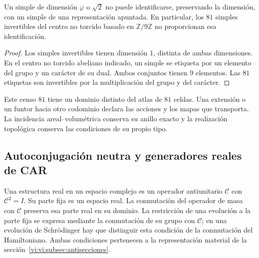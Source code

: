 \begin{proposition}
\label{vi:vi:prop:apuntada}
Un simple de dimensión $\varphi$ o $\sqrt2$ no puede identificarse,
preservando la dimensión, con un simple de una representación apuntada.
En particular, los $81$ simples invertibles del centro no torcido
basado en $\mathbb Z/9\mathbb Z$ no proporcionan esa identificación.
\end{proposition}
\begin{proof}
Los simples invertibles tienen dimensión $1$, distinta de ambas
dimensiones. En el centro no torcido abeliano indicado, un simple se
etiqueta por un elemento del grupo y un carácter de su dual. Ambos
conjuntos tienen $9$ elementos. Las $81$ etiquetas son invertibles
por la multiplicación del grupo y del carácter.
\end{proof}

Este censo $81$ tiene un dominio distinto del atlas de $81$ celdas.
Una extensión o un funtor hacia otro codominio declara las acciones
y los mapas que transporta. La incidencia areal--volumétrica conserva
su anillo exacto y la realización topológica conserva las condiciones
de su propio tipo.

\subsection{Autoconjugación neutra y generadores reales de CAR}
\label{vi:vi:subsec:majorana-categorias}

Una estructura real en un espacio complejo es un operador antiunitario
$\mathcal C$ con $\mathcal C^2=I$. Su parte fija es un espacio real.
La conmutación del operador de masa con $\mathcal C$ preserva esa
parte real en su dominio. La restricción de una evolución a la parte
fija se expresa mediante la conmutación de su grupo con $\mathcal C$;
en una evolución de Schr\"odinger hay que distinguir esta condición
de la conmutación del Hamiltoniano. Ambas condiciones pertenecen a la
representación material de la sección~\ref{vi:vi:subsec:antisecciones}.

